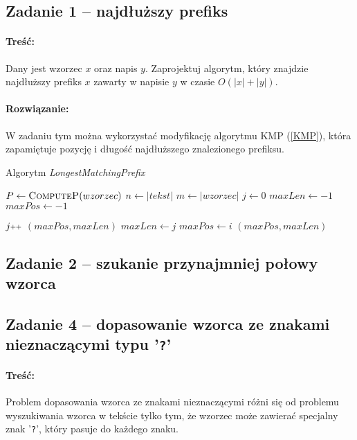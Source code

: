 \subsection{Zadanie 1 -- najdłuższy prefiks}
\paragraph{Treść:}
Dany jest wzorzec $x$ oraz napis $y$. Zaprojektuj algorytm, który znajdzie najdłuższy prefiks $x$ zawarty w napisie $y$ w czasie $O(|x|+|y|)$.

\paragraph{Rozwiązanie:}
W zadaniu tym można wykorzystać modyfikację algorytmu KMP (\ref{KMP}), która zapamiętuje pozycję i długość najdłuższego znalezionego prefiksu.

\begin{algorithm}[H]
	\caption{Algorytm \emph{LongestMatchingPrefix}}
	\begin{algorithmic}[1]
		\State $P \gets \textsc{ComputeP}(wzorzec)$
		\State $n \gets |tekst|$
		\State $m \gets |wzorzec|$
		\State $j \gets 0$
		\State $maxLen\gets-1$
		\State $maxPos\gets-1$ 
		
				\State $j\pp$
			\EndWhile
				\State\Return $(maxPos, maxLen)$
				\State $maxLen\gets j$
				\State $maxPos\gets i$
			\EndIf
		\EndFor
		\State\Return $(maxPos, maxLen)$
		\EndProcedure		
	\end{algorithmic}
\end{algorithm}

\subsection{Zadanie 2 -- szukanie przynajmniej połowy wzorca}

\subsection{Zadanie 4 -- dopasowanie wzorca ze znakami nieznaczącymi typu '\texttt{?}'}
\label{zadanie8.4}
\paragraph{Treść:}
Problem dopasowania wzorca ze znakami nieznaczącymi różni się od problemu wyszukiwania wzorca w tekście tylko tym, że wzorzec może zawierać specjalny znak '\texttt{?}', który pasuje do każdego znaku.

